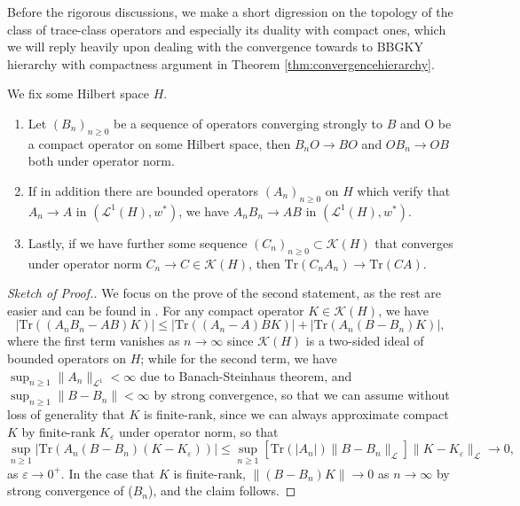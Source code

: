 Before the rigorous discussions, we make a short digression on the topology of the class of trace-class operators and especially its duality with compact ones, which we will reply heavily upon dealing with the convergence towards to BBGKY hierarchy with compactness argument in Theorem \ref{thm:convergencehierarchy}. 

\begin{lem}
  \label{lem:prod-trace-strong-convergence}We fix some Hilbert space $H$.
  \begin{enumerate}
    \item Let $(B_n)_{n \geqslant 0}$ be a sequence of operators converging
    strongly to $B$ and O be a compact operator on some Hilbert space, then
    $B_n O \rightarrow B O$ and $O B_n \rightarrow O B$ both under operator
    norm.
    
    \item If in addition there are bounded operators $(A_n)_{n \geqslant 0}$
    on $H$ which verify that $A_n \rightarrow A$ in $(\mathcal{L}^1 (H),
    w^{\ast})$, we have $A_n B_n \rightarrow A B$ in $(\mathcal{L}^1 (H),
    w^{\ast})$.
    
    \item Lastly, if we have further some sequence $(C_n)_{n \geqslant 0}
    \subset \mathcal{K} (H)$ that converges under operator norm $C_n
    \rightarrow C \in \mathcal{K} (H)$, then $\mathrm{Tr} (C_n A_n) \rightarrow
    \mathrm{Tr} (C A)$.
  \end{enumerate}
\end{lem}

\begin{proof}[Sketch of Proof.] We focus on the prove of the second statement, as the rest are easier and can be found in \cite[Lemma C.1]{de2025stochastic}
. For any compact operator $K \in \mathcal{K} (H)$, we have
    \[ | \mathrm{Tr} ((A_n B_n - A B) K) | \leqslant | \mathrm{Tr} ((A_n - A) B K)
       | + | \mathrm{Tr} (A_n (B - B_n) K) |, \]
    where the first term vanishes as $n \rightarrow \infty$ since $\mathcal{K}
    (H)$ is a two-sided ideal of bounded operators on $H$; while for the
    second term, we have $\sup_{n \geqslant 1} \| A_n \|_{\mathcal{L}^1} <
    \infty$ due to Banach-Steinhaus theorem, and $\sup_{n \geqslant 1} \| B -
    B_n \| < \infty$ by strong convergence, so that we can assume without loss
    of generality that $K$ is finite-rank, since we can always approximate
    compact $K$ by finite-rank $K_{\varepsilon}$ under operator norm, so that
    \[ \sup_{n \geqslant 1} | \mathrm{Tr} (A_n (B - B_n)  (K -
       K_{\varepsilon})) | \leq \sup_{n \geqslant 1} [\mathrm{Tr} (| A_n  |) \|
       B - B_n \|_{\mathcal{L}}] \| K - K_{\varepsilon} \|_{\mathcal{L}}
       \rightarrow 0, \]
    as $\varepsilon \rightarrow 0^+$. In the case that $K$ is finite-rank, $\|
    (B - B_n) K \| \rightarrow 0$ as $n \rightarrow \infty$ by strong
    convergence of  ($B_n$), and the claim follows. 
\end{proof}


